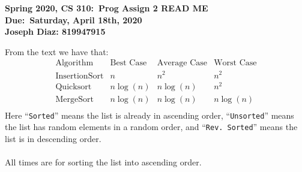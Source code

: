 \documentclass{article}
\newcommand{\il}[1]{\lstinline!#1!}
\begin{document}
	\begin{center}
		\textbf{Spring 2020, CS 310:\ Prog Assign 2 READ ME} \\
		\textbf{Due:\ Saturday, April 18th, 2020} \\
		\textbf{Joseph Diaz: 819947915}
	\end{center}
\noindent\makebox[\linewidth]{\rule{\paperwidth}{0.4pt}}
From the text we have that:
$$\begin{matrix}
\text{Algorithm} & \text{Best Case} & \text{Average Case} & \text{Worst Case} \\
\text{InsertionSort} & n & n^2 & n^2\\
\text{Quicksort} & n\log(n) & n\log(n) & n^2 \\
\text{MergeSort} & n\log(n) & n\log(n) & n\log(n) \\
\end{matrix}$$
Here ``\il{Sorted}'' means the list is already in ascending order, ``\il{Unsorted}'' means the list has random elements in a random order, and ``\il{Rev. Sorted}'' means the list is in descending order.\\\\
All times are for sorting the list into ascending order.
\end{document}
